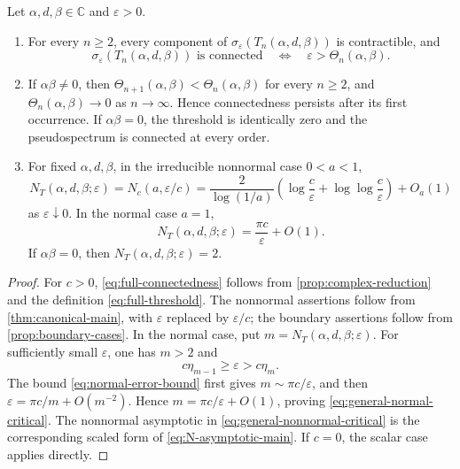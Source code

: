 \documentclass[10pt,twoside]{siamart1116}
\numberwithin{equation}{section}
\newcommand{\C}{\mathbb C}
\begin{document}
\begin{theorem}
\label{thm:main}
Let \(\alpha,d,\beta\in\C\) and \(\varepsilon>0\).
\begin{enumerate}
\item For every \(n\geq2\), every component of
\(\sigma_\varepsilon(T_n(\alpha,d,\beta))\) is
contractible, and
\begin{equation}\label{eq:full-connectedness}
 \sigma_\varepsilon(T_n(\alpha,d,\beta))\text{ is connected}
 \quad\Longleftrightarrow\quad \varepsilon>\Theta_n(\alpha,\beta).
\end{equation}
\item If \(\alpha\beta\ne0\), then
\(\Theta_{n+1}(\alpha,\beta)<\Theta_n(\alpha,\beta)\) for every \(n\geq2\),
and \(\Theta_n(\alpha,\beta)\to0\) as \(n\to\infty\).  Hence connectedness
persists after its first occurrence.  If \(\alpha\beta=0\), the threshold is
identically zero and the pseudospectrum is connected at every order.
\item For fixed \(\alpha,d,\beta\), in the irreducible nonnormal case
\(0<a<1\),
\begin{equation}\label{eq:general-nonnormal-critical}
 N_T(\alpha,d,\beta;\varepsilon)=N_c(a,\varepsilon/c)
 =\frac{2}{\log(1/a)}
 \left(\log\frac c\varepsilon+
 \log\!\log\frac c\varepsilon\right)+O_a(1)
\end{equation}
as \(\varepsilon\downarrow0\).  In the normal case \(a=1\),
\begin{equation}\label{eq:general-normal-critical}
 N_T(\alpha,d,\beta;\varepsilon)
 =\frac{\pi c}{\varepsilon}+O(1).
\end{equation}
If \(\alpha\beta=0\), then \(N_T(\alpha,d,\beta;\varepsilon)=2\).
\end{enumerate}
\end{theorem}

\begin{proof}
For \(c>0\), \eqref{eq:full-connectedness} follows from
\cref{prop:complex-reduction} and the definition
\eqref{eq:full-threshold}.  The nonnormal assertions follow from
\cref{thm:canonical-main}, with \(\varepsilon\) replaced by
\(\varepsilon/c\); the boundary assertions follow from
\cref{prop:boundary-cases}.  In the normal case, put
\(m=N_T(\alpha,d,\beta;\varepsilon)\).  For sufficiently small
\(\varepsilon\), one has \(m>2\) and
\[
 c\eta_{m-1}\geq\varepsilon>c\eta_m.
\]
The bound \eqref{eq:normal-error-bound} first gives
\(m\sim\pi c/\varepsilon\), and then
\(\varepsilon=\pi c/m+O(m^{-2})\).  Hence
\(m=\pi c/\varepsilon+O(1)\), proving
\eqref{eq:general-normal-critical}.  The nonnormal asymptotic in
\eqref{eq:general-nonnormal-critical} is the corresponding scaled form of
\eqref{eq:N-asymptotic-main}.  If \(c=0\), the scalar case applies directly.
\end{proof}
\end{document}
